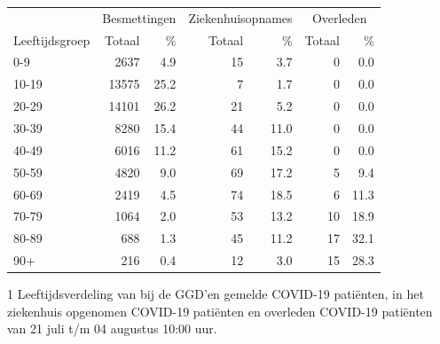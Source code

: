 \documentclass[
  english,
  man,floatsintext]{apa6}
\begin{document}
\begin{table}
\centering\begingroup\fontsize{11}{13}\selectfont

\begin{threeparttable}
\begin{tabular}{lrrrrrr}
\toprule
\multicolumn{1}{c}{ } & \multicolumn{2}{c}{Besmettingen} & \multicolumn{2}{c}{Ziekenhuisopnames} & \multicolumn{2}{c}{Overleden} \\
\cmidrule(l{3pt}r{3pt}){2-3} \cmidrule(l{3pt}r{3pt}){4-5} \cmidrule(l{3pt}r{3pt}){6-7}
Leeftijdsgroep & Totaal & \% & Totaal & \% & Totaal & \%\\
\midrule
0-9 & 2637 & 4.9 & 15 & 3.7 & 0 & 0.0\\
10-19 & 13575 & 25.2 & 7 & 1.7 & 0 & 0.0\\
20-29 & 14101 & 26.2 & 21 & 5.2 & 0 & 0.0\\
30-39 & 8280 & 15.4 & 44 & 11.0 & 0 & 0.0\\
40-49 & 6016 & 11.2 & 61 & 15.2 & 0 & 0.0\\
50-59 & 4820 & 9.0 & 69 & 17.2 & 5 & 9.4\\
60-69 & 2419 & 4.5 & 74 & 18.5 & 6 & 11.3\\
70-79 & 1064 & 2.0 & 53 & 13.2 & 10 & 18.9\\
80-89 & 688 & 1.3 & 45 & 11.2 & 17 & 32.1\\
90+ & 216 & 0.4 & 12 & 3.0 & 15 & 28.3\\
\bottomrule
\end{tabular}
\begin{tablenotes}
\item[1] Leeftijdsverdeling van bij de GGD’en gemelde COVID-19 patiënten, in het ziekenhuis opgenomen COVID-19 patiënten en overleden COVID-19 patiënten van 21 juli t/m 04 augustus 10:00 uur.
\end{tablenotes}
\end{threeparttable}
\endgroup{}
\end{table}

\newpage
\end{document}
